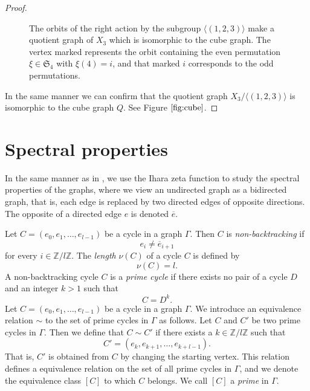 \documentclass[lualatex,12pt]{article}
\begin{document}
\begin{proof}
\begin{center}
\begin{figure}[H]
\begin{center}
   \caption{The orbits of the right action by the subgroup $\langle(1,2,3)\rangle$
   make a quotient graph of $X_3$ which is isomorphic to the cube graph.
   The vertex marked  represents the orbit containing
   the even permutation $\xi\in {\mathfrak S}_{4}$ with $\xi(4)=i$,
   and that marked \textcircled{$i$} corresponds to the odd permutations.
   }
   \label{fig:cube}
  \end{center}
 \end{figure} 
\end{center}
 In the same manner we can confirm that the quotient graph
 $X_3/\langle(1,2,3)\rangle$ is isomorphic to the cube graph $Q$.
 See Figure $\ref{fig:cube}$.
\end{proof}


\section{Spectral properties}

In the same manner as in \cite{ishikawa2024non},
we use the Ihara zeta function
to study the spectral properties of the graphs,
where we  view an undirected graph
as a bidirected graph, that is,
each edge is replaced by two directed edges of
opposite directions.
The opposite of a directed edge $e$ is denoted $\overline{e}$.


Let $C=(e_0,e_1,\ldots, e_{l-1})$ be a cycle in
a graph $\Gamma$.
Then $C$ is {\em non-backtracking} if
\[
 e_i\neq \overline{e}_{i+1} 
\]
for every $i\in {\mathbb Z}/l{\mathbb Z}$.
The {\em length} $\nu(C)$ of a cycle $C$ is defined by
\[
 \nu(C) = l.
\]
A non-backtracking cycle $C$ is a {\em prime cycle} 
if there exists no pair of a cycle $D$ and an integer $k>1$ such that
\[
 C = D^k.
\]
Let $C=(e_0,e_1,\ldots, e_{l-1})$ be a cycle in a
graph $\Gamma$.
We  introduce an equivalence relation $\sim$ to the set of prime cycles
in $\Gamma$ as follows.
Let $C$ and $C'$ be two prime cycles in $\Gamma$.
Then we define that $C\sim C'$ if  there exists a $k\in {\mathbb Z}/l{\mathbb Z}$ such that
\[
 C' = (e_k, e_{k+1}, \ldots, e_{k+l-1}).
\]
That is, $C'$ is obtained from $C$ by changing the starting vertex.
This relation defines a equivalence relation on the set of all prime cycles in $\Gamma$,
and we denote the equivalence class $[C]$
to which $C$ belongs.
We call $[C]$ a {\em prime} in $\Gamma$.
\end{document}
